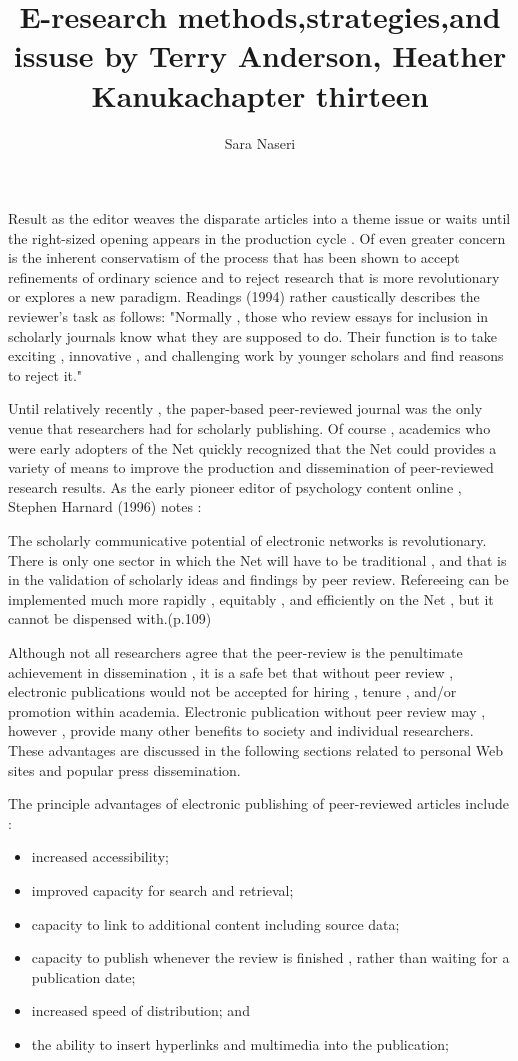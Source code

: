 \documentclass{article}
\title{E-research methods,strategies,and issuse by Terry Anderson, Heather Kanuka}
\author{Sara Naseri }
\begin{document}
\maketitle

\title{chapter thirteen}

Result as the editor weaves the disparate articles into a theme issue or waits until the right-sized opening appears in the production cycle . Of even greater concern is the inherent conservatism of the process that has been shown to accept refinements of ordinary science and to reject research that is more revolutionary or explores a new paradigm. Readings (1994) rather caustically describes the reviewer's task as follows: "Normally , those who review essays for inclusion in scholarly journals know what they are supposed to do. Their function is to take exciting , innovative , and challenging work by younger scholars and find reasons to reject it."

Until relatively recently , the paper-based peer-reviewed journal was the only venue that researchers had for scholarly publishing. Of course , academics who were early adopters of the Net quickly recognized that the Net could provides a variety of means to improve the production and dissemination of peer-reviewed research results. As the early pioneer editor of psychology content online , Stephen Harnard (1996) notes :

The scholarly communicative potential of electronic networks is revolutionary. There is only one sector in which the Net will have to be traditional , and that is in the validation of scholarly ideas and findings by peer review. Refereeing can be implemented much more rapidly , equitably , and efficiently  on the Net , but it cannot be dispensed with.(p.109)

Although not all researchers agree that the peer-review is the penultimate achievement in dissemination , it is a safe bet that without peer review , electronic publications would not be accepted for hiring , tenure , and/or promotion within academia. Electronic publication without peer review may , however , provide many other benefits to society and individual researchers. These advantages are discussed in the following sections related to personal Web sites and popular press dissemination.


The principle advantages of electronic publishing of peer-reviewed articles include :

\begin{itemize}
\item increased accessibility;
\item improved capacity for search and retrieval;
\item capacity to link to additional content including source data;
\item capacity to publish whenever the review is finished , rather than waiting for a publication date;
\item increased speed of distribution; and
\item the ability to insert hyperlinks and multimedia into the publication;
\end{itemize}
\end{document}
